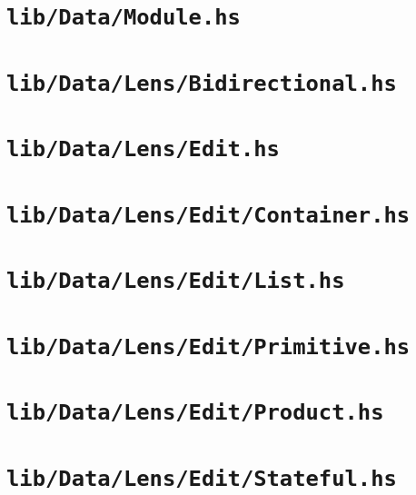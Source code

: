\section{\texttt{lib/Data/Module.hs}}
\label{mod:Data.Module}


\section{\texttt{lib/Data/Lens/Bidirectional.hs}}
\label{mod:Data.Lens.Bidirectional}


\section{\texttt{lib/Data/Lens/Edit.hs}}
\label{mod:Data.Lens.Edit}


\section{\texttt{lib/Data/Lens/Edit/Container.hs}}
\label{mod:Data.Lens.Edit.Container}


\section{\texttt{lib/Data/Lens/Edit/List.hs}}
\label{mod:Data.Lens.Edit.List}


\section{\texttt{lib/Data/Lens/Edit/Primitive.hs}}
\label{mod:Data.Lens.Edit.Primitive}


\section{\texttt{lib/Data/Lens/Edit/Product.hs}}
\label{mod:Data.Lens.Edit.Product}


\section{\texttt{lib/Data/Lens/Edit/Stateful.hs}}
\label{mod:Data.Lens.Edit.Stateful}


